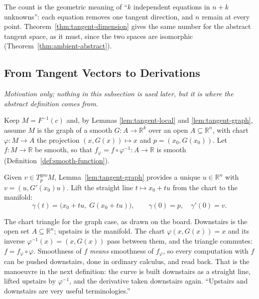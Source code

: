 \documentclass[11pt]{report}
\newcommand{\geo}{\mathrm{geo}}
\begin{document}
The count is the geometric meaning of ``$k$ independent equations in $n + k$ unknowns'': each equation removes one tangent direction, and $n$ remain at every point. Theorem~\ref{thm:tangent-dimension} gives the same number for the abstract tangent space, as it must, since the two spaces are isomorphic (Theorem~\ref{thm:ambient-abstract}).

\subsection{From Tangent Vectors to Derivations}\label{sub:derivations-motivation}

\textit{Motivation only; nothing in this subsection is used later, but it is where the abstract definition comes from.}

Keep $M = F^{-1}(c)$ and, by Lemmas \ref{lem:tangent-local} and \ref{lem:tangent-graph}, assume $M$ is the graph of a smooth $G : A \to \mathbb{R}^k$ over an open $A \subseteq \mathbb{R}^n$, with chart $\varphi : M \to A$ the projection $(x, G(x)) \mapsto x$ and $p = (x_0, G(x_0))$. Let $f : M \to \mathbb{R}$ be smooth, so that $f_\varphi = f \circ \varphi^{-1} : A \to \mathbb{R}$ is smooth (Definition~\ref{def:smooth-function}).

Given $v \in T^{\geo}_pM$, Lemma~\ref{lem:tangent-graph} provides a unique $u \in \mathbb{R}^n$ with $v = (u, G'(x_0)u)$. Lift the straight line $t \mapsto x_0 + tu$ from the chart to the manifold:
\[
\gamma(t) = \big(x_0 + tu,\; G(x_0 + tu)\big), \qquad \gamma(0) = p, \quad \gamma'(0) = v .
\]

\begin{center}
\end{center}

The chart triangle for the graph case, as drawn on the board. Downstairs is the open set $A \subseteq \mathbb{R}^n$; upstairs is the manifold. The chart $\varphi(x, G(x)) = x$ and its inverse $\varphi^{-1}(x) = (x, G(x))$ pass between them, and the triangle commutes: $f = f_\varphi \circ \varphi$. Smoothness of $f$ \emph{means} smoothness of $f_\varphi$, so every computation with $f$ can be pushed downstairs, done in ordinary calculus, and read back. That is the manoeuvre in the next definition: the curve is built downstairs as a straight line, lifted upstairs by $\varphi^{-1}$, and the derivative taken downstairs again. ``Upstairs and downstairs are very useful terminologies.''
\end{document}
